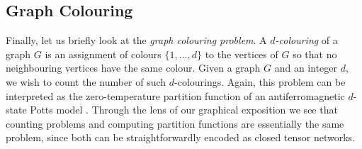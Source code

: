 





\subsection{Graph Colouring}


Finally, let us briefly look at the \emph{graph colouring problem}. A \emph{$d$-colouring} of a graph $G$ is an assignment of colours $\{1, ..., d\}$ to the vertices of $G$ so that no neighbouring vertices have the same colour. Given a graph $G$ and an integer $d$, we wish to count the number of such $d$-colourings. Again, this problem can be interpreted as the zero-temperature
partition function of an antiferromagnetic $d$-state Potts model \cite{ChromaticPotts}.
Through the lens of our graphical exposition we see that counting problems and computing partition functions are essentially the same problem, since both can be straightforwardly encoded as closed tensor networks.

